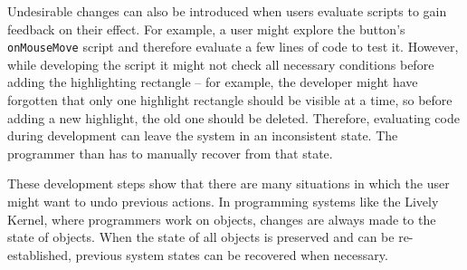 Undesirable changes can also be introduced when users evaluate scripts
to gain feedback on their effect. For example, a user might explore
the button's \lstinline{onMouseMove} script and therefore evaluate a
few lines of code to test it.  However, while developing the script it
might not check all necessary conditions before adding the
highlighting rectangle -- for example, the developer might have
forgotten that only one highlight rectangle should be visible at a
time, so before adding a new highlight, the old one should be
deleted. Therefore, evaluating code during development can leave the
system in an inconsistent state.
The programmer than has to manually recover from that state.

These development steps show that there are many situations in which
the user might want to undo previous actions.  In programming systems
like the Lively Kernel, where programmers work on objects, changes are
always made to the state of objects. When the state of all objects is
preserved and can be re-established, previous system states can be
recovered when necessary.


